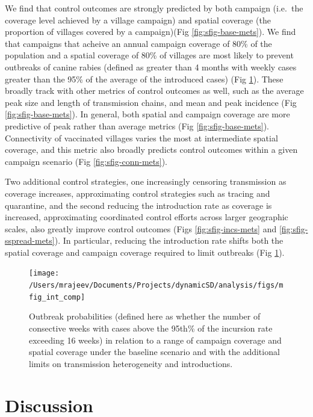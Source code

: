 \documentclass[
]{book}
\begin{document}
We find that control outcomes are strongly predicted by both campaign (i.e.~the coverage level achieved by a village campaign) and spatial coverage (the proportion of villages covered by a campaign)(Fig \ref{fig:sfig-base-mets}). We find that campaigns that acheive an annual campaign coverage of 80\% of the population and a spatial coverage of 80\% of villages are most likely to prevent outbreaks of canine rabies (defined as greater than 4 months with weekly cases greater than the 95\% of the average of the introduced cases) (Fig \ref{fig:mfig-int-comp}). These broadly track with other metrics of control outcomes as well, such as the average peak size and length of transmission chains, and mean and peak incidence (Fig \ref{fig:sfig-base-mets}). In general, both spatial and campaign coverage are more predictive of peak rather than average metrics (Fig \ref{fig:sfig-base-mets}). Connectivity of vaccinated villages varies the most at intermediate spatial coverage, and this metric also broadly predicts control outcomes within a given campaign scenario (Fig \ref{fig:sfig-conn-mets}).

Two additional control strategies, one increasingly censoring transmission as coverage increases, approximating control strategies such as tracing and quarantine, and the second reducing the introduction rate as coverage is increased, approximating coordinated control efforts across larger geographic scales, also greatly improve control outcomes (Figs \ref{fig:sfig-incs-mets} and \ref{fig:sfig-sspread-mets}). In particular, reducing the introduction rate shifts both the spatial coverage and campaign coverage required to limit outbreaks (Fig \ref{fig:mfig-int-comp}).

\begin{figure}
\texttt{[image: /Users/mrajeev/Documents/Projects/dynamicSD/analysis/figs/mfig\_int\_comp]} \caption{Outbreak probabilities (defined here as whether the number of consective weeks with cases above the 95th\% of the incursion rate exceeding 16 weeks) in relation to a range of campaign coverage and spatial coverage under the baseline scenario and with the additional limits on transmission heterogeneity and introductions.}\label{fig:mfig-int-comp}
\end{figure}



\hypertarget{discussion-2}{%
\section{Discussion}\label{discussion-2}}
\end{document}
